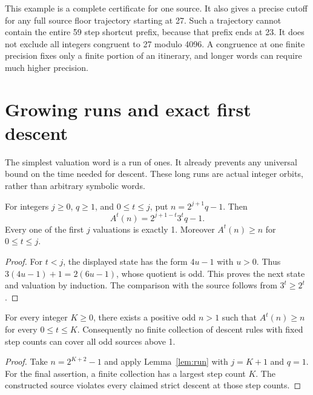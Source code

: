 
This example is a complete certificate for one source. It also gives a precise cutoff for any full source floor trajectory starting at 27. Such a trajectory cannot contain the entire 59 step shortcut prefix, because that prefix ends at 23. It does not exclude all integers congruent to 27 modulo 4096. A congruence at one finite precision fixes only a finite portion of an itinerary, and longer words can require much higher precision.

\section{Growing runs and exact first descent}
The simplest valuation word is a run of ones. It already prevents any universal bound on the time needed for descent. These long runs are actual integer orbits, rather than arbitrary symbolic words.

\begin{lemma}\label{lem:run}
For integers $j\ge0$, $q\ge1$, and $0\le t\le j$, put $n=2^{j+1}q-1$. Then
\begin{equation}\label{eq:run}
A^t(n)=2^{j+1-t}3^t q-1.
\end{equation}
Every one of the first $j$ valuations is exactly 1. Moreover $A^t(n)\ge n$ for $0\le t\le j$.
\end{lemma}
\begin{proof}
For $t<j$, the displayed state has the form $4u-1$ with $u>0$. Thus $3(4u-1)+1=2(6u-1)$, whose quotient is odd. This proves the next state and valuation by induction. The comparison with the source follows from $3^t\ge2^t$.
\end{proof}

\begin{theorem}\label{thm:horizon}
For every integer $K\ge0$, there exists a positive odd $n>1$ such that $A^t(n)\ge n$ for every $0\le t\le K$. Consequently no finite collection of descent rules with fixed step counts can cover all odd sources above 1.
\end{theorem}
\begin{proof}
Take $n=2^{K+2}-1$ and apply Lemma~\ref{lem:run} with $j=K+1$ and $q=1$. For the final assertion, a finite collection has a largest step count $K$. The constructed source violates every claimed strict descent at those step counts.
\end{proof}

